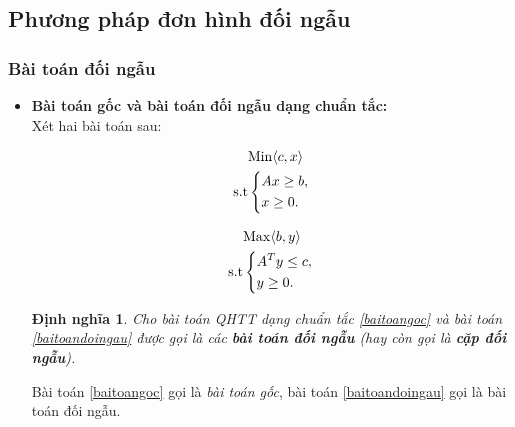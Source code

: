 \documentclass[12pt,a4paper]{report}
\newtheorem{dn}{Định nghĩa}
\begin{document}
\subsection{Phương pháp đơn hình đối ngẫu}
\subsubsection{ Bài toán đối ngẫu }
\begin{itemize}
    \item \textbf{Bài toán gốc và bài toán đối ngẫu dạng chuẩn tắc:}\\
    Xét hai bài toán sau:\\
    \begin{minipage}[t]{0.48\linewidth}
   \begin{equation}\label{baitoangoc}
     \begin{split}
          & {\rm{Min}} \langle c,x \rangle\\
          \rm{s.t} &\left\{\begin{split}
            & Ax\ge b,\\
            & x \ge 0.\\
           \end{split}\right.
       \end{split}
   \end{equation}
\end{minipage}\hfill
\begin{minipage}[t]{0.48\linewidth}
\begin{equation}\label{baitoandoingau}
    \begin{split}
        & {\rm{Max}} \langle b,y \rangle\\
       \rm{s.t} & \left\{\begin{split}
            &A^Ty \le c,\\
            & y\ge 0.\\
        \end{split}\right.
    \end{split}
\end{equation}
\end{minipage}
\begin{dn}
    Cho bài toán QHTT dạng chuẩn tắc \eqref{baitoangoc} và bài toán \eqref{baitoandoingau} được gọi là các \textbf{bài toán đối ngẫu } (hay còn gọi là \textbf{cặp đối ngẫu}).\\
\end{dn}
Bài toán \eqref{baitoangoc} gọi là \textit{bài toán gốc}, bài toán \eqref{baitoandoingau} gọi là bài toán đối ngẫu.\\

\end{itemize}
\end{document}
